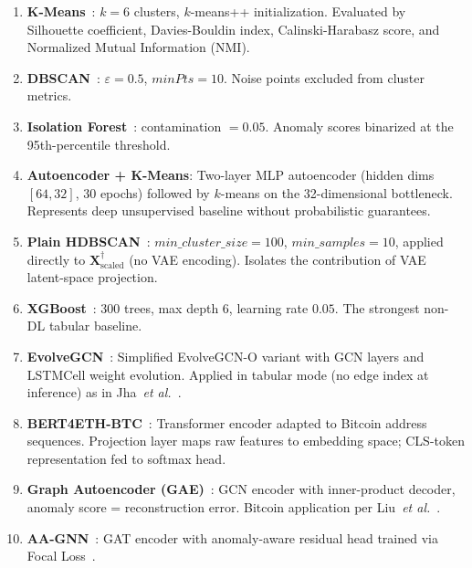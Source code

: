 \documentclass[journal]{IEEEtran}
\begin{document}
\begin{enumerate}[leftmargin=*, label=\textbf{B\arabic*}]

  \item \textbf{K-Means}~\cite{Lloyd1982}: $k = 6$ clusters, $k$-means++
    initialization. Evaluated by Silhouette coefficient, Davies-Bouldin index,
    Calinski-Harabasz score, and Normalized Mutual Information (NMI).

  \item \textbf{DBSCAN}~\cite{Ester1996}: $\varepsilon = 0.5$,
    $\textit{minPts} = 10$. Noise points excluded from cluster metrics.

  \item \textbf{Isolation Forest}~\cite{Liu2008}: contamination $= 0.05$.
    Anomaly scores binarized at the 95th-percentile threshold.

  \item \textbf{Autoencoder + K-Means}: Two-layer MLP autoencoder
    (hidden dims $[64, 32]$, 30 epochs) followed by $k$-means on the
    32-dimensional bottleneck. Represents deep unsupervised baseline without
    probabilistic guarantees.

  \item \textbf{Plain HDBSCAN}~\cite{McInnes2017}: $\textit{min\_cluster\_size}
    = 100$, $\textit{min\_samples} = 10$, applied directly to
    $\mathbf{X}^{\dagger}_{\text{scaled}}$ (no VAE encoding).
    Isolates the contribution of VAE latent-space projection.

  \item \textbf{XGBoost}~\cite{Chen2016}: $300$ trees, max depth $6$,
    learning rate $0.05$. The strongest non-DL tabular baseline.

  \item \textbf{EvolveGCN}~\cite{Pareja2020}: Simplified EvolveGCN-O variant
    with GCN layers and LSTMCell weight evolution.
    Applied in tabular mode (no edge index at inference) as in
    Jha~\emph{et al.}~\cite{Jha2023}.

  \item \textbf{BERT4ETH-BTC}~\cite{He2023}: Transformer encoder adapted
    to Bitcoin address sequences.  Projection layer maps raw features to
    embedding space; CLS-token representation fed to softmax head.

  \item \textbf{Graph Autoencoder (GAE)}~\cite{Kipf2016b}: GCN encoder
    with inner-product decoder, anomaly score = reconstruction error.
    Bitcoin application per Liu~\emph{et al.}~\cite{Liu2024}.

  \item \textbf{AA-GNN}~\cite{Fan2024}: GAT encoder with anomaly-aware
    residual head trained via Focal Loss~\cite{Lin2017}.

\end{enumerate}
\end{document}
